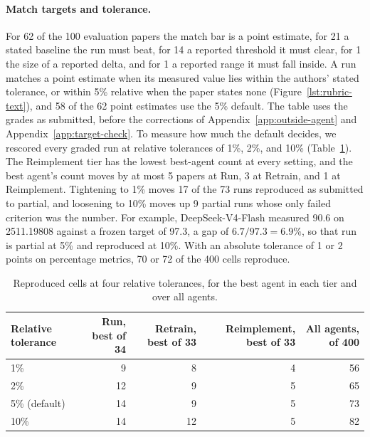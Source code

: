 \paragraph{Match targets and tolerance.} For 62 of the 100 evaluation papers
the match bar is a point estimate, for 21 a stated baseline the run must beat,
for 14 a reported threshold it must clear, for 1 the size of a reported delta,
and for 1 a reported range it must fall inside. A run matches a
point estimate when its measured value lies within the authors' stated
tolerance, or within 5\% relative when the paper states none
(Figure~\ref{lst:rubric-text}), and 58 of the 62 point estimates use the 5\%
default. The table uses the grades as submitted, before the corrections of Appendix~\ref{app:outside-agent} and Appendix~\ref{app:target-check}. To measure how much the default decides, we rescored every graded run
at relative tolerances of 1\%, 2\%, and 10\% (Table~\ref{tab:tolerance}). The
Reimplement tier has the lowest best-agent count at every setting, and the best agent's count moves
by at most 5 papers at Run, 3 at Retrain, and 1 at Reimplement. Tightening to
1\% moves 17 of the 73 runs reproduced as submitted to partial, and loosening to 10\% moves
up 9 partial runs whose only failed criterion was the number. For example,
DeepSeek-V4-Flash measured 90.6 on 2511.19808 against a frozen target of 97.3,
a gap of $6.7 / 97.3 = 6.9\%$, so that run is partial at 5\% and reproduced at
10\%. With an absolute tolerance of 1 or 2 points on percentage metrics, 70 or
72 of the 400 cells reproduce.

\begin{table}[ht]
\centering
\small
\begin{tabular}{@{}lrrrr@{}}
\toprule
Relative tolerance & Run, best of 34 & Retrain, best of 33 & Reimplement, best of 33 & All agents, of 400 \\
\midrule
1\%           &  9 &  8 & 4 & 56 \\
2\%           & 12 &  9 & 5 & 65 \\
5\% (default) & 14 &  9 & 5 & 73 \\
10\%          & 14 & 12 & 5 & 82 \\
\bottomrule
\end{tabular}
\caption{Reproduced cells at four relative tolerances, for the best agent in
each tier and over all agents.}
\label{tab:tolerance}
\end{table}

